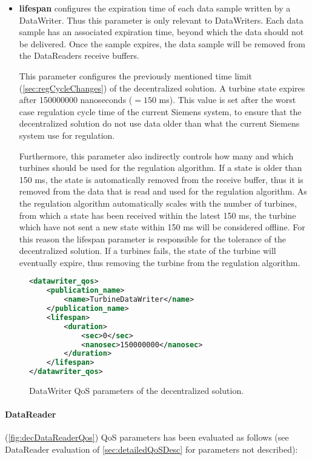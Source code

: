 \begin{itemize}
	\item \textbf{lifespan} configures the expiration time of each data sample written by a DataWriter. Thus this parameter is only relevant to DataWriters. Each data sample has an associated expiration time, beyond which the data should not be delivered. Once the sample expires, the data sample will be removed from the DataReaders receive buffers. 
	
	This parameter configures the previously mentioned time limit (\cref{sec:regCycleChanges}) of the decentralized solution. A turbine state expires after 150000000 nanoseconds ($=150$ ms). This value is set after the worst case regulation cycle time of the current Siemens system, to ensure that the decentralized solution do not use data older than what the current Siemens system use for regulation.
	
	Furthermore, this parameter also indirectly controls how many and which turbines should be used for the regulation algorithm. If a state is older than 150 ms, the state is automatically removed from the receive buffer, thus it is removed from the data that is read and used for the regulation algorithm. As the regulation algorithm automatically scales with the number of turbines, from which a state has been received within the latest 150 ms, the turbine which have not sent a new state within 150 ms will be considered offline. For this reason the lifespan parameter is responsible for the tolerance of the decentralized solution. If a turbines fails, the state of the turbine will eventually expire, thus removing the turbine from the regulation algorithm.
\end{itemize}

\begin{figure}[t]
\begin{lstlisting}[language=XML]
<datawriter_qos>
	<publication_name>
		<name>TurbineDataWriter</name>
	</publication_name>
	<lifespan>
		<duration>
			<sec>0</sec>
			<nanosec>150000000</nanosec>
		</duration>
	</lifespan>
</datawriter_qos>
\end{lstlisting}
\caption[Decentralized DataWriter QoS parameters]{
		\label{fig:decDataWriterQos} 
		\footnotesize{DataWriter QoS parameters of the decentralized solution.}
	}
\end{figure}

\paragraph{DataReader} (\cref{fig:decDataReaderQos}) QoS parameters has been evaluated as follows (see DataReader evaluation of \cref{sec:detailedQoSDesc} for parameters not described):

